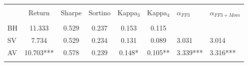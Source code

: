 \begin{tabular}{@{\extracolsep{5pt}} lcccccHH} 
	\\[-1.8ex]\hline 
	\hline \\[-1.8ex] 
	& Return & Sharpe & Sortino & Kappa$_{3}$ & Kappa$_{4}$ & $\alpha_{FF3}$ & $\alpha_{FF3+Mom}$ \\ 
	\hline \\[-1.8ex] 
BH & 11.333 & 0.529 & 0.237 & 0.153 & 0.115 &  &  \\ 
SV & 7.734 & 0.529 & 0.234 & 0.131 & 0.089 & 3.031 & 3.014 \\ 
AV & 10.703*** & 0.578 & 0.239 & 0.148* & 0.105** & 3.339*** & 3.316*** \\ 
\hline \\[-1.8ex] 
\end{tabular}